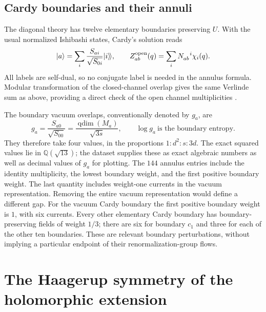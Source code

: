 \subsection{Cardy boundaries and their annuli}

The diagonal theory has twelve elementary boundaries preserving $U$.
With the usual normalized Ishibashi states, Cardy's solution reads
\begin{equation}
 |a\rangle=\sum_i\frac{S_{ai}}{\sqrt{S_{0i}}}|i\rangle\!\rangle,
 \qquad
 Z_{ab}^{\rm open}(q)=\sum_iN_{ab}^{\phantom{ab}i}\chi_i(q).
 \label{eq:physics-Cardy}
\end{equation}
All labels are self-dual, so no conjugate label is needed in the annulus
formula. Modular transformation of the closed-channel overlap gives
the same Verlinde sum as above, providing a direct check of the open
channel multiplicities \cite{Cardy}.

The boundary vacuum overlaps, conventionally denoted by $g_a$, are
\begin{equation}
 g_a=\frac{S_{a0}}{\sqrt{S_{00}}}
     =\frac{\operatorname{qdim}(M_a)}{\sqrt{3s}},
 \qquad \log g_a\ \text{is the boundary entropy}.
 \label{eq:physics-g}
\end{equation}
They therefore take four values, in the proportions
$1:d^2:s:3d$. The exact squared values lie in $\mathbb Q(\sqrt{13})$;
the dataset supplies these as exact algebraic numbers as well as
decimal values of $g_a$ for plotting. The $144$ annulus entries include
the identity multiplicity, the lowest boundary weight, and the first
positive boundary weight. The last quantity includes weight-one
currents in the vacuum representation. Removing the entire vacuum
representation would define a different gap.
For the vacuum Cardy boundary the first positive boundary weight is
$1$, with six currents. Every other elementary Cardy boundary has
boundary-preserving fields of weight $1/3$; there are six for boundary
$c_1$ and three for each of the other ten boundaries. These are relevant
boundary perturbations, without implying a particular endpoint of
their renormalization-group flows.

\section{The Haagerup symmetry of the holomorphic extension}
\label{sec:physics-H3}

